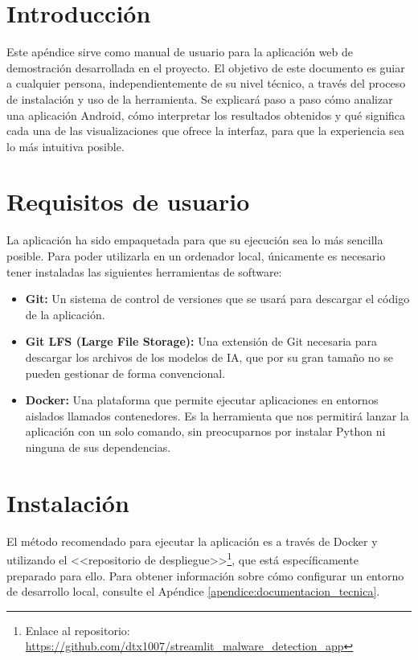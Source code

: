
\section{Introducción}
Este apéndice sirve como manual de usuario para la aplicación web de demostración desarrollada en el proyecto. El objetivo de este documento es guiar a cualquier persona, independientemente de su nivel técnico, a través del proceso de instalación y uso de la herramienta. Se explicará paso a paso cómo analizar una aplicación Android, cómo interpretar los resultados obtenidos y qué significa cada una de las visualizaciones que ofrece la interfaz, para que la experiencia sea lo más intuitiva posible.

\section{Requisitos de usuario}

La aplicación ha sido empaquetada para que su ejecución sea lo más sencilla posible. Para poder utilizarla en un ordenador local, únicamente es necesario tener instaladas las siguientes herramientas de software:

\begin{itemize}
	\item \textbf{Git:} Un sistema de control de versiones que se usará para descargar el código de la aplicación.
	
	\item \textbf{Git LFS (Large File Storage):} Una extensión de Git necesaria para descargar los archivos de los modelos de IA, que por su gran tamaño no se pueden gestionar de forma convencional.
	
	\item \textbf{Docker:} Una plataforma que permite ejecutar aplicaciones en entornos aislados llamados contenedores. Es la herramienta que nos permitirá lanzar la aplicación con un solo comando, sin preocuparnos por instalar Python ni ninguna de sus dependencias.
\end{itemize}

\section{Instalación}

El método recomendado para ejecutar la aplicación es a través de Docker y utilizando el <<repositorio de despliegue>>\footnote{Enlace al repositorio: \url{https://github.com/dtx1007/streamlit_malware_detection_app}}, que está específicamente preparado para ello. Para obtener información sobre cómo configurar un entorno de desarrollo local, consulte el Apéndice \ref{apendice:documentacion_tecnica}.

